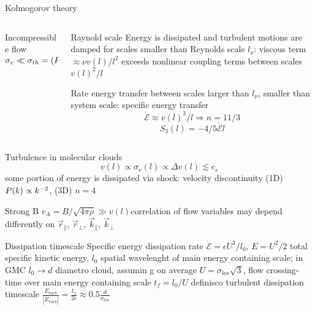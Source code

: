 \begin{frame}{Kolmogorov theory}
\begin{columns}[T]\begin{column}{0.5\textwidth}
\begin{block}{Incompressible flow}
$\sigma_v\ll\sigma_{th}=(P_{th}/\rho)^{1/2}$
\end{block}
\end{column}\begin{column}{0.5\textwidth}
\begin{block}{Raynold scale}
Energy is dissipated and turbulent motions are damped for scales smaller than Reynolds scale $l_{\nu}$: viscous term $\approx\nu v(l)/l^2$ exceeds nonlinear coupling terms between scales $v(l)^2/l$
\end{block}
\begin{block}{Rate energy transfer between scales}
larger than $l_{\nu}$, smaller than system scale: specific energy transfer
\[\dot{\mathcal{E}}\approx v(l)^3/l\Rightarrow n=11/3\]
\[S_3(l)=-4/5\dot{\mathcal{E}}l\]
\end{block}
\end{column}\end{columns}
\end{frame}

\begin{frame}{Turbulence in molecular clouds}
\[v(l)\propto\sigma_v(l)\propto\Delta  v(l)\lesssim c_s\]
some portion of energy is dissipated via shock: velocity discontinuity (1D) $P(k)\propto k^{-2}$, (3D) $n=4$
\begin{block}{Strong B}
$v_A=B/\sqrt{4\pi\rho}\gg v(l)$correlation of flow variables may depend differently on $\vec{r}_{\parallel}$, $\vec{r}_{\perp}$, $\vec{k}_{\parallel}$, $\vec{k}_{\perp}$
\end{block}
\begin{block}{Dissipation timescale}
Specific energy dissipation rate $\dot{\mathcal{E}}=\epsilon U^3/l_0$, $E=U^2/2$ total specific kinetic energy, $l_0$ spatial wavelenght of main energy containing scale; in GMC $l_0\to d$ diametro cloud, assumin g on average $U=\sigma_{los}\sqrt{3}$, flow crossing-time over main energy containing scale $t_f=l_0/U$ definisco turbulent dissipation timescale $\frac{E_{turb}}{|\dot{E}_{turb}|}=\frac{t_f}{2\epsilon}\approx0.5\frac{d}{\sigma_{los}}$
\end{block}
\end{frame}

